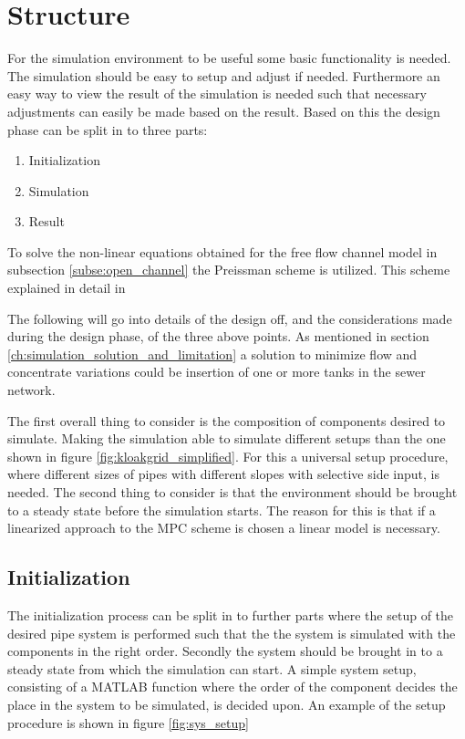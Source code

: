 \section{Structure}\label{sec:Structure}
For the simulation environment to be useful some basic functionality is needed. The simulation should be easy to setup and adjust if needed. 
Furthermore an easy way to view the result of the simulation is needed such that necessary adjustments can easily be made based on the result.
Based on this the design phase can be split in to three parts:

\begin{enumerate}
	\item Initialization
	\item Simulation
	\item Result
\end{enumerate}

To solve the non-linear equations obtained for the free flow channel model in subsection \ref{subse:open_channel} the Preissman scheme is utilized. This scheme explained in detail in  

The following will go into details of the design off, and the considerations made during the design phase, of the three above points.
As mentioned in section \ref{ch:simulation_solution_and_limitation} a solution to minimize flow and concentrate variations could be insertion of one or more tanks in the sewer network. 

The first overall thing to consider is the composition of components desired to simulate. Making the simulation able to simulate different setups than the one shown in figure \ref{fig:kloakgrid_simplified}. For this a universal setup procedure, where different sizes of pipes with different slopes with selective side input, is needed. 
The second thing to consider is that the environment should be brought to a steady state before the simulation starts. The reason for this is that if a linearized approach to the MPC scheme is chosen a linear model is necessary.  

\subsection*{Initialization} 
The initialization process can be split in to further parts where the setup of the desired pipe system is performed such that the the system is simulated with the components in the right order.
Secondly the system should be brought in to a steady state from which the simulation can start. A simple system setup, consisting of a MATLAB function where the order of the component decides the place in the system to be simulated, is decided upon. An example of the setup procedure is shown in figure \ref{fig:sys_setup}  

